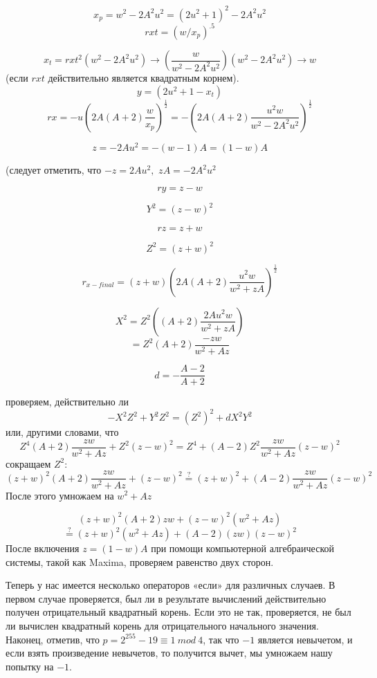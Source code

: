 \documentclass[12pt,english]{mrl}
\begin{document}
\[
x_{p}=w^{2}-2A^{2}u^{2}=\left(2u^{2}+1\right)^{2}-2A^{2}u^{2}
\]
\[
rxt=\left(w/x_{p}\right)^{.5}
\]


\[
x_{t}=rxt^{2}\left(w^{2}-2A^{2}u^{2}\right)\to\left(\frac{w}{w^{2}-2A^{2}u^{2}}\right)\left(w^{2}-2A^{2}u^{2}\right)\to w
\]
(если $rxt$ действительно является квадратным корнем).
\[
y=\left(2u^{2}+1-x_{t}\right)
\]
\[
rx=-u\left(2A\left(A+2\right)\frac{w}{x_{p}}\right)^{\frac{1}{2}}=-\left(2A\left(A+2\right)\frac{u^{2}w}{w^{2}-2A^{2}u^{2}}\right)^{\frac{1}{2}}
\]


\[
z=-2Au^{2}=-\left(w-1\right)A=\left(1-w\right)A
\]


(следует отметить, что $-z=2Au^{2},$ $zA=-2A^{2}u^{2}$

\[
ry=z-w
\]


\[
Y^{2}=\left(z-w\right)^{2}
\]


\[
rz=z+w
\]


\[
Z^{2}=\left(z+w\right)^{2}
\]


\[
r_{x-final}=\left(z+w\right)\left(2A\left(A+2\right)\frac{u^{2}w}{w^{2}+zA}\right)^{\frac{1}{2}}
\]


\[
X^{2}=Z^{2}\left(\left(A+2\right)\frac{2Au^{2}w}{w^{2}+zA}\right)
\]
\[
=Z^{2}\left(A+2\right)\frac{-zw}{w^{2}+Az}
\]


\[
d=-\frac{A-2}{A+2}
\]


проверяем, действительно ли
\[
-X^{2}Z^{2}+Y^{2}Z^{2}=\left(Z^{2}\right)^{2}+dX^{2}Y^{2}
\]
или, другими словами, что
\[
Z^{4}\left(A+2\right)\frac{zw}{w^{2}+Az}+Z^{2}\left(z-w\right)^{2}=Z^{4}+\left(A-2\right)Z^{2}\frac{zw}{w^{2}+Az}\left(z-w\right)^{2}
\]
сокращаем $Z^{2}$:
\[
\left(z+w\right)^{2}\left(A+2\right)\frac{zw}{w^{2}+Az}+\left(z-w\right)^{2}\overset{?}{=}\left(z+w\right)^{2}+\left(A-2\right)\frac{zw}{w^{2}+Az}\left(z-w\right)^{2}
\]
После этого умножаем на $w^{2}+Az$

\[
\left(z+w\right)^{2}\left(A+2\right)zw+\left(z-w\right)^{2}\left(w^{2}+Az\right)
\]
\[\overset{?}{=}\left(z+w\right)^{2}\left(w^{2}+Az\right)+\left(A-2\right)\left(zw\right)\left(z-w\right)^{2}
\]
После включения $z=\left(1-w\right)A$ при помощи компьютерной алгебраической системы, такой как Maxima, проверяем равенство двух сторон.
\par
Теперь у нас имеется несколько операторов «если» для различных случаев. В первом случае проверяется, был ли в результате вычислений действительно получен отрицательный квадратный корень. Если это не так, проверяется, не был ли вычислен квадратный корень для отрицательного начального значения. Наконец, отметив, что $p = 2^255 - 19\equiv 1\ mod\ 4$, так что $-1$ является невычетом, и если взять произведение невычетов, то получится вычет, мы умножаем нашу попытку на $-1$.



\end{document}
